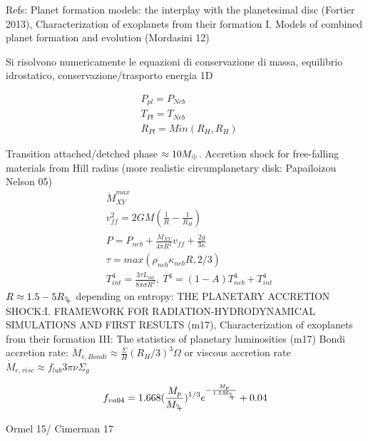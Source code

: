 Refs: Planet formation models: the interplay with the planetesimal disc (Fortier 2013), Characterization of exoplanets from their formation I. Models of combined planet formation and evolution (Mordasini 12)

Si risolvono numericamente le equazioni di conservazione di massa, equilibrio idrostatico, conservazione/trasporto energia 1D

\begin{workout}
\begin{align}
&P_{pl}=P_{Neb}\\
&T_{Pl}=T_{Neb}\\
&R_{Pl}=Min(R_H,R_H)
\end{align}
\end{workout}


\begin{workout}
Transition attached/detched phase $\approx10M_{\oplus}{}$.
Accretion shock for free-falling materials from Hill radius (more realistic circumplanetary disk: Papailoizou Nelson 05)
\begin{align}
&\dot{M}_{XY}^{max}\\
&v_{ff}^2=2GM(\frac{1}{R}-\frac{1}{R_H})\\
&P=P_{neb}+\frac{\dot{M}_{XY}}{4\pi R^2}v_{ff}+\frac{2g}{3\kappa}\\
&\tau=max(\rho_{neb}\kappa_{neb}R,2/3)\\
&T^4_{int}=\frac{3\tau L_{int}}{8\pi\sigma R^2},\ T^4=(1-A)T_{neb}^4+T_{int}^4
\end{align}
$R\approx1.5-5\rjupiter{}$ depending on entropy: THE PLANETARY ACCRETION SHOCK:I. FRAMEWORK FOR RADIATION-HYDRODYNAMICAL SIMULATIONS AND FIRST RESULTS (m17), Characterization of exoplanets from their formation III: The statistics of planetary luminosities (m17)
Bondi accretion rate: $\dot{M}_{e, Bondi}\approx\frac{\Sigma}{H}(R_H/3)^3\Omega$ or viscous accretion rate $\dot{M}_{e, visc}\approx f_{lub}3\pi\nu\Sigma_g$
\end{workout}

\begin{workout}
\begin{equation}
f_{va04}=1.668(\frac{M_p}{\mjupiter{}})\expy{1/3}\exp{-\frac{M_p}{1.5\mjupiter{}}}+0.04
\end{equation}
\end{workout}

\begin{workout}
Ormel 15/ Cimerman 17
\end{workout}


